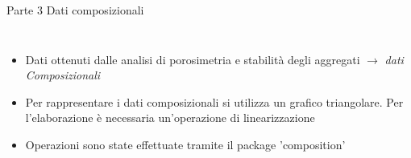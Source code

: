 \documentclass[10pt]{beamer}
\begin{document}
\begin{frame}{Parte 3 \small{Dati composizionali}}

  \begin{columns}
    \vspace{1cm}
    \footnotesize
    \begin{itemize}[<+->]
    \item Dati ottenuti dalle analisi di porosimetria e
      stabilità degli aggregati $\rightarrow$ \emph{dati Composizionali}%
      \pause
    \item Per rappresentare i dati composizionali si utilizza un
      grafico triangolare. Per l'elaborazione è necessaria
      un'operazione di linearizzazione
    \item Operazioni sono state effettuate tramite il package 'composition'
    \end{itemize}

  \end{columns}
\end{frame}
\end{document}
